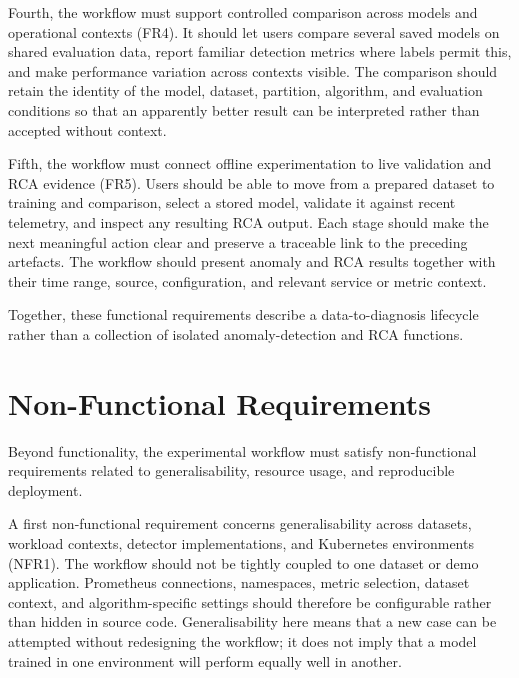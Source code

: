 Fourth, the workflow must support controlled comparison across models and operational contexts (FR4). It should let users compare several saved models on shared evaluation data, report familiar detection metrics where labels permit this, and make performance variation across contexts visible. The comparison should retain the identity of the model, dataset, partition, algorithm, and evaluation conditions so that an apparently better result can be interpreted rather than accepted without context.

Fifth, the workflow must connect offline experimentation to live validation and RCA evidence (FR5). Users should be able to move from a prepared dataset to training and comparison, select a stored model, validate it against recent telemetry, and inspect any resulting RCA output. Each stage should make the next meaningful action clear and preserve a traceable link to the preceding artefacts. The workflow should present anomaly and RCA results together with their time range, source, configuration, and relevant service or metric context.

Together, these functional requirements describe a data-to-diagnosis lifecycle rather than a collection of isolated anomaly-detection and RCA functions.

\section{Non-Functional Requirements}
Beyond functionality, the experimental workflow must satisfy non-functional requirements related to generalisability, resource usage, and reproducible deployment.



A first non-functional requirement concerns generalisability across datasets, workload contexts, detector implementations, and Kubernetes environments (NFR1). The workflow should not be tightly coupled to one dataset or demo application. Prometheus connections, namespaces, metric selection, dataset context, and algorithm-specific settings should therefore be configurable rather than hidden in source code. Generalisability here means that a new case can be attempted without redesigning the workflow; it does not imply that a model trained in one environment will perform equally well in another.

